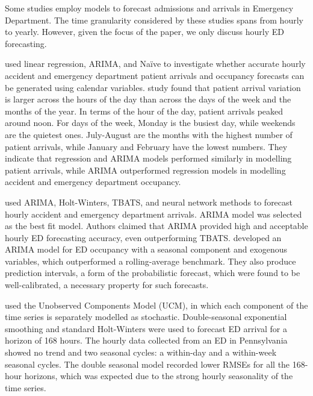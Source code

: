 \documentclass[]{elsarticle} %
\begin{document}
Some studies employ models to forecast admissions and arrivals in Emergency Department. The time granularity considered by these studies spans from hourly to yearly. However, given the focus of the paper, we only discuss hourly ED forecasting.

\citet{hertzum2017forecasting} used linear regression, ARIMA, and Naïve to investigate whether accurate hourly accident and emergency department patient arrivals and occupancy forecasts can be generated using calendar variables. \citet{hertzum2017forecasting} study found that patient arrival variation is larger across the hours of the day than across the days of the week and the months of the year. In terms of the hour of the day, patient arrivals peaked around noon. For days of the week, Monday is the busiest day, while weekends are the quietest ones. July-August are the months with the highest number of patient arrivals, while January and February have the lowest numbers. They indicate that regression and ARIMA models performed similarly in modelling patient arrivals, while ARIMA outperformed regression models in modelling accident and emergency department occupancy.

\citet{choudhury2020forecasting} used ARIMA, Holt-Winters, TBATS, and neural network methods to forecast hourly accident and emergency department arrivals. ARIMA model was selected as the best fit model. Authors claimed that ARIMA provided high and acceptable hourly ED forecasting accuracy, even outperforming TBATS. \citet{Cheng2021} developed an ARIMA model for ED occupancy with a seasonal component and exogenous variables, which outperformed a rolling-average benchmark. They also produce prediction intervals, a form of the probabilistic forecast, which were found to be well-calibrated, a necessary property for such forecasts.

\citet{morzuch2006forecasting} used the Unobserved Components Model (UCM), in which each component of the time series is separately modelled as stochastic. Double-seasonal exponential smoothing and standard Holt-Winters were used to forecast ED arrival for a horizon of 168 hours. The hourly data collected from an ED in Pennsylvania showed no trend and two seasonal cycles: a within-day and a within-week seasonal cycles. The double seasonal model recorded lower RMSEs for all the 168-hour horizons, which was expected due to the strong hourly seasonality of the time series.
\end{document}
